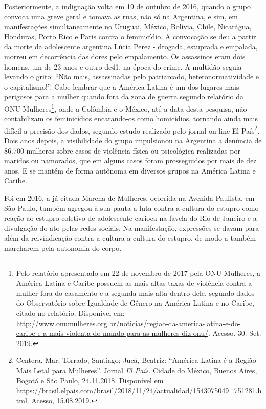 Posteriormente, a indignação volta em 19 de outubro de 2016, quando o
grupo convoca uma greve geral e tomava as ruas, não só na Argentina, e
sim, em manifestações simultaneamente no Uruguai, México, Bolívia,
Chile, Nicarágua, Honduras, Porto Rico e Paris contra o feminicídio. A
convocação se deu a partir da morte da adolescente argentina Lúcia Perez
- drogada, estuprada e empalada, morreu em decorrência das dores pelo
empalamento. Os assassinos eram dois homens, um de 23 anos e outro de41,
na época do crime. A multidão seguia levando o grito: ``Não mais,
assassinadas pelo patriarcado, heteronormatividade e o capitalismo!''.
Cabe lembrar que a América Latina é um dos lugares mais perigosos para a
mulher quando fora da zona de guerra segundo relatório da ONU
Mulheres\footnote{Pelo relatório apresentado em 22 de novembro de 2017
  pela ONU-Mulheres, a América Latina e Caribe possuem as mais altas
  taxas de violência contra a mulher fora do casamento e a segunda mais
  alta dentro dele, segundo dados do Observatório sobre Igualdade de
  Gênero na América Latina e no Caribe, citado no relatório. Disponível
  em:
  \url{http://www.onumulheres.org.br/noticias/regiao-da-america-latina-e-do-caribe-e-a-mais-violenta-do-mundo-para-as-mulheres-diz-onu/}.
  Acesso. 30. Set. 2019.}, onde a Colômbia e o México, até a data desta
pesquisa, não contabilizam os feminicídios encarando-os como homicídios,
tornando ainda mais difícil a precisão dos dados, segundo estudo
realizado pelo jornal on-line El País\footnote{Centera, Mar; Torrado,
  Santiago; Jucá, Beatriz: ``América Latina é a Região Mais Letal para
  Mulheres''. Jornal \emph{El País}. Cidade do México, Buenos Aires,
  Bogotá e São Paulo, 24.11.2018. Disponível em
  \url{https://brasil.elpais.com/brasil/2018/11/24/actualidad/1543075049_751281.html}.
  Acesso, 15.08.2019.}. Dois anos depois, a visibilidade do grupo
impulsionou na Argentina a denúncia de 86.700 mulheres sobre casos de
violência física ou psicológica realizadas por maridos ou namorados, que
em alguns casos foram prosseguidos por mais de dez anos. E se mantém de
forma autônoma em diversos grupos na América Latina e Caribe.

Foi em 2016, a já citada Marcha de Mulheres, ocorrida na Avenida
Paulista, em São Paulo, também agregou à sua pauta a luta contra a
cultura do estupro como reação ao estupro coletivo de adolescente
carioca na favela do Rio de Janeiro e a divulgação do ato pelas redes
sociais. Na manifestação, expressões se davam para além da reivindicação
contra a cultura a cultura do estupro, de modo a também marcharem pela
autonomia do corpo.

